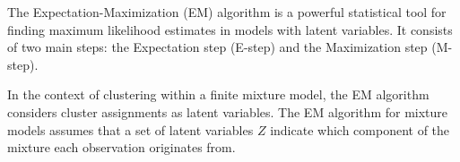 \documentclass{article}
\begin{document}






The Expectation-Maximization (EM) algorithm is a powerful statistical tool for finding maximum likelihood estimates in models with latent variables. It consists of two main steps: the Expectation step (E-step) and the Maximization step (M-step).

In the context of clustering within a finite mixture model, the EM algorithm considers cluster assignments as latent variables. 
The EM algorithm for mixture models assumes that a set of latent variables $Z$ indicate which component of the mixture each observation originates from.
\end{document}
